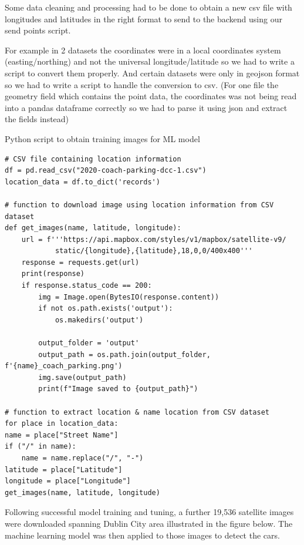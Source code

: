 Some data cleaning and processing had to be done to obtain a new csv file with
longitudes and latitudes in the right format to send to the backend using our
send points script.

For example in 2 datasets the coordinates were in a local coordinates system
(easting/northing) and not the universal longitude/latitude so we had to write a
script to convert them properly. And certain datasets were only in geojson
format so we had to write a script to handle the conversion to csv. (For one
file the geometry field which contains the point data, the coordinates was not
being read into a pandas dataframe correctly so we had to parse it using json
and extract the fields instead)

\begin{listing}[htbp]
    \centering
    \caption{Python script to obtain training images for ML model}
    \begin{verbatim}
# CSV file containing location information
df = pd.read_csv("2020-coach-parking-dcc-1.csv")
location_data = df.to_dict('records')

# function to download image using location information from CSV dataset
def get_images(name, latitude, longitude):
    url = f'''https://api.mapbox.com/styles/v1/mapbox/satellite-v9/
            static/{longitude},{latitude},18,0,0/400x400'''
    response = requests.get(url)
    print(response)
    if response.status_code == 200:
        img = Image.open(BytesIO(response.content))
        if not os.path.exists('output'):
            os.makedirs('output')

        output_folder = 'output'
        output_path = os.path.join(output_folder, f'{name}_coach_parking.png')
        img.save(output_path)
        print(f"Image saved to {output_path}")

# function to extract location & name location from CSV dataset
for place in location_data:
name = place["Street Name"]
if ("/" in name):
    name = name.replace("/", "-")
latitude = place["Latitude"]
longitude = place["Longitude"]
get_images(name, latitude, longitude)
    \end{verbatim}
\end{listing}
Following successful model training and tuning, a further 19,536 satellite
images were downloaded spanning Dublin City area illustrated in the figure
below. The machine learning model was then applied to those images to detect the
cars.
